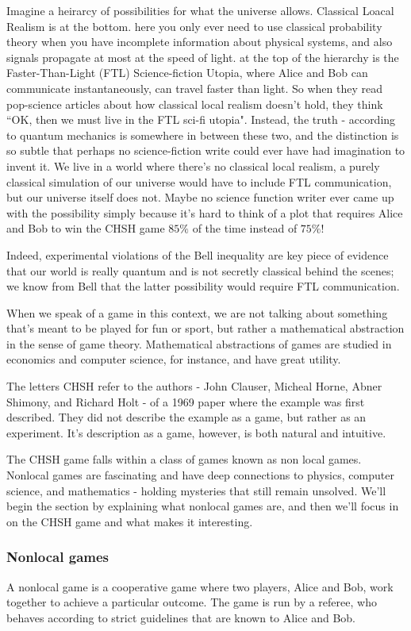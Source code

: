 Imagine a heirarcy of possibilities for what the universe allows. Classical Loacal Realism is at the bottom. here you only ever need to use classical probability theory when you have incomplete information about physical systems, and also signals propagate at most at the speed of light. at the top of the hierarchy is the Faster-Than-Light (FTL) Science-fiction Utopia, where Alice and Bob can communicate instantaneously, can travel faster than light. So when they read pop-science articles about how classical local realism doesn't hold, they think ``OK, then we must live in the FTL sci-fi utopia". Instead, the truth - according to quantum mechanics is somewhere in between these two, and the distinction is so subtle that perhaps no science-fiction write could ever have had imagination to invent it. We live in a world where there's no classical local realism, a purely classical simulation of our universe would have to include FTL communication, but our universe itself does not. Maybe no science function writer ever came up with the possibility simply because it's hard to think of a plot that requires Alice and Bob to win the CHSH game $85\%$ of the time instead of $75\%$!

Indeed, experimental violations of the Bell inequality are key piece of evidence that our world is really quantum and is not secretly classical behind the scenes; we know from Bell that the latter possibility would require FTL communication.

When we speak of a game in this context, we are not talking about something that's meant to be played for fun or sport, but rather a mathematical abstraction in the sense of game theory. Mathematical abstractions of games are studied in economics and computer science, for instance, and have great utility.

The letters CHSH refer to the authors - John Clauser, Micheal Horne, Abner Shimony, and Richard Holt - of a 1969 paper where the example was first described. They did not describe the example as a game, but rather as an experiment. It's description as a game, however, is both natural and intuitive.

The CHSH game falls within a class of games known as non local games. Nonlocal games are fascinating and have deep connections to physics, computer science, and mathematics - holding mysteries that still remain unsolved. We'll begin the section by explaining what nonlocal games are, and then we'll focus in on the CHSH game and what makes it interesting.

\subsubsection{Nonlocal games}
A nonlocal game is a cooperative game where two players, Alice and Bob, work together to achieve a particular outcome. The game is run by a referee, who behaves according to strict guidelines that are known to Alice and Bob.


